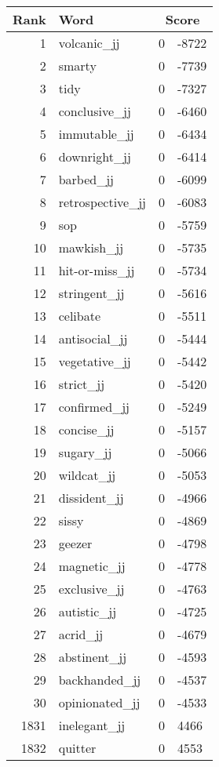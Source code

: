 \begin{longtable}[!htbp]{| rlr@{.}l |}
    \hline
    \textbf{Rank} & \textbf{Word} & \multicolumn{2}{c|}{\textbf{Score}} \\
    \hline
    \endhead
    1 & volcanic\_jj & 0 & -8722 \\
    2 & smarty & 0 & -7739 \\
    3 & tidy & 0 & -7327 \\
    4 & conclusive\_jj & 0 & -6460 \\
    5 & immutable\_jj & 0 & -6434 \\
    6 & downright\_jj & 0 & -6414 \\
    7 & barbed\_jj & 0 & -6099 \\
    8 & retrospective\_jj & 0 & -6083 \\
    9 & sop & 0 & -5759 \\
    10 & mawkish\_jj & 0 & -5735 \\
    11 & hit-or-miss\_jj & 0 & -5734 \\
    12 & stringent\_jj & 0 & -5616 \\
    13 & celibate & 0 & -5511 \\
    14 & antisocial\_jj & 0 & -5444 \\
    15 & vegetative\_jj & 0 & -5442 \\
    16 & strict\_jj & 0 & -5420 \\
    17 & confirmed\_jj & 0 & -5249 \\
    18 & concise\_jj & 0 & -5157 \\
    19 & sugary\_jj & 0 & -5066 \\
    20 & wildcat\_jj & 0 & -5053 \\
    21 & dissident\_jj & 0 & -4966 \\
    22 & sissy & 0 & -4869 \\
    23 & geezer & 0 & -4798 \\
    24 & magnetic\_jj & 0 & -4778 \\
    25 & exclusive\_jj & 0 & -4763 \\
    26 & autistic\_jj & 0 & -4725 \\
    27 & acrid\_jj & 0 & -4679 \\
    28 & abstinent\_jj & 0 & -4593 \\
    29 & backhanded\_jj & 0 & -4537 \\
    30 & opinionated\_jj & 0 & -4533 \\
    1831 & inelegant\_jj & 0 & 4466 \\
    1832 & quitter & 0 & 4553 \\

\end{longtable}
